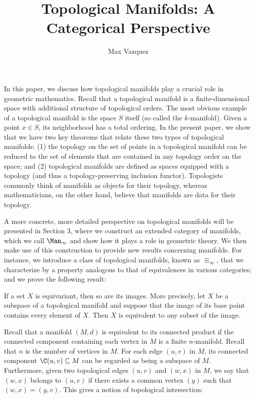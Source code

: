 \documentclass[a4paper,reqno,oneside]{article}
\begin{document}
\title{Topological Manifolds: A Categorical Perspective}
\author{Max Vazquez}
\maketitle


In this paper, we discuss how topological manifolds play a crucial role in geometric mathematics. Recall that a topological manifold is a finite-dimensional space with additional structure of topological orders. The most obvious example of a topological manifold is the space $S$ itself (so called the $k$-manifold). Given a point $x \in S$, its neighborhood has a total ordering. In the present paper, we show that we have two key theorems that relate these two types of topological manifolds: (1) the topology on the set of points in a topological manifold can be reduced to the set of elements that are contained in any topology order on the space; and (2) topological manifolds are defined as spaces equipped with a topology (and thus a topology-preserving inclusion functor). Topologists commonly think of manifolds as objects for their topology, whereas mathematicians, on the other hand, believe that manifolds are data for their topology.


A more concrete, more detailed perspective on topological manifolds will be presented in Section 3, where we construct an extended category of manifolds, which we call $\Man_{\infty}$ and show how it plays a role in geometric theory. We then make use of this construction to provide new results concerning manifolds. For instance, we introduce a class of topological manifolds, known as $\Equiv_{\infty}$, that we characterize by a property analogous to that of equivalences in various categories; and we prove the following result:

\begin{theorem}\label{thm:toplogical_equivalence}
    If a set $X$ is equivariant, then so are its images. More precisely, let $X$ be a subspace of a topological manifold and suppose that the image of its base point contains every element of $X$. Then $X$ is equivalent to any subset of the image.
\end{theorem}


Recall that a manifold $(M, d)$ is equivalent to its connected product if the connected component containing each vertex in $M$ is a finite $n$-manifold. Recall that $n$ is the number of vertices in $M$. For each edge $(u,v)$ in $M$, its connected component $\C(u, v) \subseteq M$ can be regarded as being a subspace of $M$. Furthermore, given two topological edges $(u,v)$ and $(w,x)$ in $M$, we say that $(w,x)$ belongs to $(u,v)$ if there exists a common vertex $(y)$ such that $(w,x)= (y,v)$. This gives a notion of topological intersection:
\end{document}
